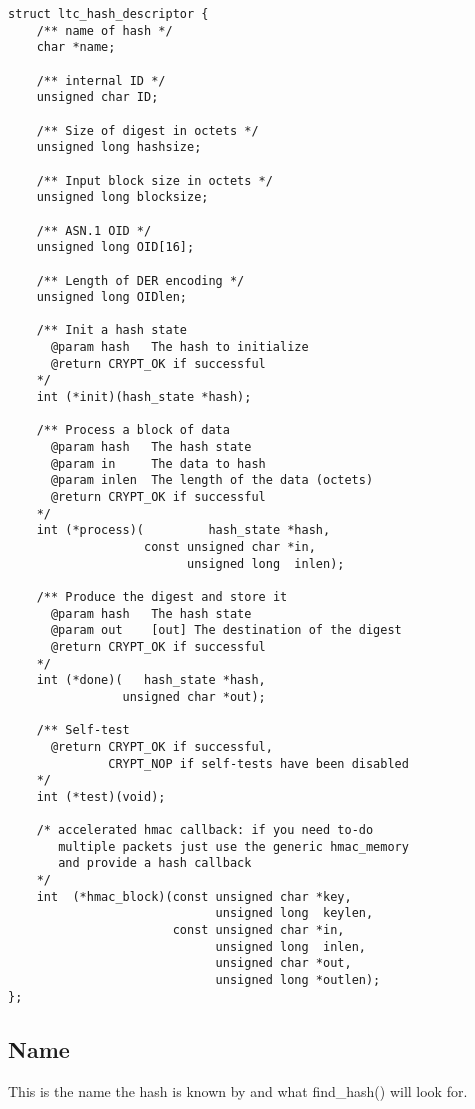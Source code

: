\documentclass[synpaper]{book}
\begin{document}
\begin{small}
\begin{verbatim}
struct ltc_hash_descriptor {
    /** name of hash */
    char *name;

    /** internal ID */
    unsigned char ID;

    /** Size of digest in octets */
    unsigned long hashsize;

    /** Input block size in octets */
    unsigned long blocksize;

    /** ASN.1 OID */
    unsigned long OID[16];

    /** Length of DER encoding */
    unsigned long OIDlen;

    /** Init a hash state
      @param hash   The hash to initialize
      @return CRYPT_OK if successful
    */
    int (*init)(hash_state *hash);

    /** Process a block of data
      @param hash   The hash state
      @param in     The data to hash
      @param inlen  The length of the data (octets)
      @return CRYPT_OK if successful
    */
    int (*process)(         hash_state *hash,
                   const unsigned char *in,
                         unsigned long  inlen);

    /** Produce the digest and store it
      @param hash   The hash state
      @param out    [out] The destination of the digest
      @return CRYPT_OK if successful
    */
    int (*done)(   hash_state *hash,
                unsigned char *out);

    /** Self-test
      @return CRYPT_OK if successful,
              CRYPT_NOP if self-tests have been disabled
    */
    int (*test)(void);

    /* accelerated hmac callback: if you need to-do
       multiple packets just use the generic hmac_memory
       and provide a hash callback
    */
    int  (*hmac_block)(const unsigned char *key,
                             unsigned long  keylen,
                       const unsigned char *in,
                             unsigned long  inlen,
                             unsigned char *out,
                             unsigned long *outlen);
};
\end{verbatim}
\end{small}

\subsection{Name}
This is the name the hash is known by and what find\_hash() will look for.
\end{document}
